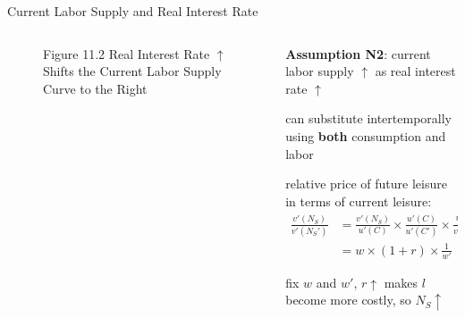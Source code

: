 \documentclass[11pt,aspectratio=169,usenames,dvipsnames]{beamer}
\let\tempone\itemize
\let\temptwo\enditemize
\renewenvironment{itemize}{\tempone\addtolength{\itemsep}{\fill}}{\temptwo}
\begin{document}
\begin{frame}{Current Labor Supply and Real Interest Rate}
\label{slide:Current_Labor_Supply_and_Real_Interest_Rate}
    \begin{columns}
        \begin{column}{0.48\textwidth}
            \begin{figure}
                \caption{\scriptsize Figure 11.2  Real Interest Rate $ \uparrow  $ Shifts the Current Labor Supply Curve to the Right}
            \end{figure}
        \end{column}
        \begin{column}{0.52\textwidth}
            \textbf{Assumption N2}: current labor supply $ \uparrow  $ as real interest rate $ \uparrow  $
            \begin{itemize}
                \item can substitute \alert{intertemporally} using \textbf{both} consumption and labor
                \item \alert{relative price of future leisure in terms of current leisure}:
                    \begin{align*}
                        \frac{v'( N_{S} )}{v'( N_{S}' )}
                            & = \frac{v'( N_{S} )}{u'( C )} \times \frac{u'( C )}{u'( C' )} \times \frac{u'( C' )}{v'( N_{S}' )}
                        \\
                            & = w \times ( 1+r ) \times \frac{1}{w'}
                    \end{align*}
                \item fix $ w $ and $ w' $, $ r \uparrow  $ makes $ l $ become more costly, so $ N_{S} \uparrow  $
            \end{itemize}
        \end{column}
    \end{columns}
\end{frame}
\end{document}
